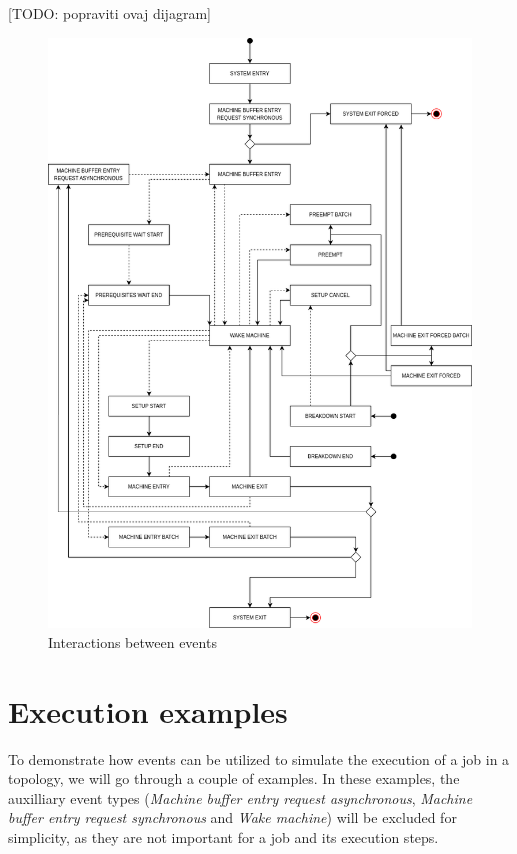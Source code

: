 [TODO: popraviti ovaj dijagram]
\begin{figure}[!htbp]
	\centering
	\includegraphics[scale=0.5]{../images/events.png}
	\caption{Interactions between events}
    \label{fig:interactions_between_events}
\end{figure}

\section{Execution examples}
\label{sec:execution_examples}

To demonstrate how events can be utilized to simulate the execution of a job in a topology, we will go through a couple of examples. In these examples, the auxilliary event types (\textit{Machine buffer entry request asynchronous}, \textit{Machine buffer entry request synchronous} and \textit{Wake machine}) will be excluded for simplicity, as they are not important for a job and its execution steps.

